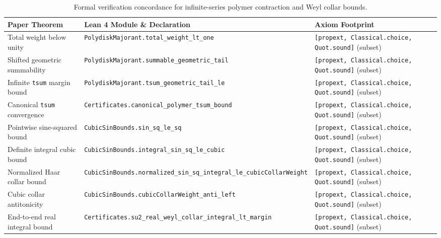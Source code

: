 \documentclass[11pt,a4paper]{article}
\begin{document}
\begin{table}[ht]
\centering
\scriptsize
\begin{tabular}{@{}p{4.0cm}p{7.1cm}p{3.3cm}@{}}
\toprule
Paper Theorem & Lean 4 Module \& Declaration & Axiom Footprint \\
\midrule
Total weight below unity & \texttt{PolydiskMajorant.}\newline\texttt{total\_weight\_lt\_one} & \texttt{[propext, Classical.choice,} \texttt{Quot.sound]} (subset) \\
Shifted geometric summability & \texttt{PolydiskMajorant.}\newline\texttt{summable\_geometric\_tail} & \texttt{[propext, Classical.choice,} \texttt{Quot.sound]} (subset) \\
Infinite \texttt{tsum} margin bound & \texttt{PolydiskMajorant.}\newline\texttt{tsum\_geometric\_tail\_le} & \texttt{[propext, Classical.choice,} \texttt{Quot.sound]} (subset) \\
Canonical \texttt{tsum} convergence & \texttt{Certificates.}\newline\texttt{canonical\_polymer\_tsum\_bound} & \texttt{[propext, Classical.choice,} \texttt{Quot.sound]} (subset) \\
Pointwise sine-squared bound & \texttt{CubicSinBounds.}\newline\texttt{sin\_sq\_le\_sq} & \texttt{[propext, Classical.choice,} \texttt{Quot.sound]} (subset) \\
Definite integral cubic bound & \texttt{CubicSinBounds.}\newline\texttt{integral\_sin\_sq\_le\_cubic} & \texttt{[propext, Classical.choice,} \texttt{Quot.sound]} (subset) \\
Normalized Haar collar bound & \texttt{CubicSinBounds.}\newline\texttt{normalized\_sin\_sq\_integral\_le\_\-cubicCollarWeight} & \texttt{[propext, Classical.choice,} \texttt{Quot.sound]} (subset) \\
Cubic collar antitonicity & \texttt{CubicSinBounds.}\newline\texttt{cubicCollarWeight\_anti\_left} & \texttt{[propext, Classical.choice,} \texttt{Quot.sound]} (subset) \\
End-to-end real integral bound & \texttt{Certificates.}\newline\texttt{su2\_real\_weyl\_collar\_integral\_lt\_margin} & \texttt{[propext, Classical.choice,} \texttt{Quot.sound]} (subset) \\
\bottomrule
\end{tabular}
\caption{Formal verification concordance for infinite-series polymer contraction and Weyl collar bounds.}
\label{tab:paper2-concordance}
\end{table}



\end{document}
